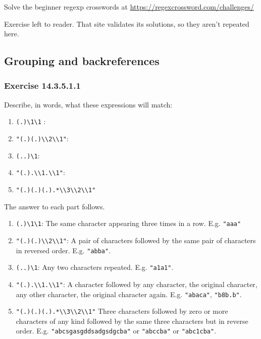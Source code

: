 \documentclass[]{book}
\providecommand{\tightlist}{%
  \setlength{\itemsep}{0pt}\setlength{\parskip}{0pt}}
\theoremstyle{plain}
\theoremstyle{remark}
\begin{document}
Solve the beginner regexp crosswords at
\url{https://regexcrossword.com/challenges/}

Exercise left to reader. That site validates its solutions, so they
aren't repeated here.

\hypertarget{grouping-and-backreferences}{%
\subsection{Grouping and
backreferences}\label{grouping-and-backreferences}}

\hypertarget{exercise-14.3.5.1.1}{%
\subsubsection*{\texorpdfstring{Exercise
{14.3.5.1.1}}{Exercise 14.3.5.1.1}}\label{exercise-14.3.5.1.1}}

Describe, in words, what these expressions will match:

\begin{enumerate}
\def\labelenumi{\arabic{enumi}.}
\tightlist
\item
  \texttt{(.)\textbackslash{}1\textbackslash{}1} :
\item
  \texttt{"(.)(.)\textbackslash{}\textbackslash{}2\textbackslash{}\textbackslash{}1"}:
\item
  \texttt{(..)\textbackslash{}1}:
\item
  \texttt{"(.).\textbackslash{}\textbackslash{}1.\textbackslash{}\textbackslash{}1"}:
\item
  \texttt{"(.)(.)(.).*\textbackslash{}\textbackslash{}3\textbackslash{}\textbackslash{}2\textbackslash{}\textbackslash{}1"}
\end{enumerate}

The answer to each part follows.

\begin{enumerate}
\def\labelenumi{\arabic{enumi}.}
\tightlist
\item
  \texttt{(.)\textbackslash{}1\textbackslash{}1}: The same character
  appearing three times in a row. E.g. \texttt{"aaa"}
\item
  \texttt{"(.)(.)\textbackslash{}\textbackslash{}2\textbackslash{}\textbackslash{}1"}:
  A pair of characters followed by the same pair of characters in
  reversed order. E.g. \texttt{"abba"}.
\item
  \texttt{(..)\textbackslash{}1}: Any two characters repeated. E.g.
  \texttt{"a1a1"}.
\item
  \texttt{"(.).\textbackslash{}\textbackslash{}1.\textbackslash{}\textbackslash{}1"}:
  A character followed by any character, the original character, any
  other character, the original character again. E.g. \texttt{"abaca"},
  \texttt{"b8b.b"}.
\item
  \texttt{"(.)(.)(.).*\textbackslash{}\textbackslash{}3\textbackslash{}\textbackslash{}2\textbackslash{}\textbackslash{}1"}
  Three characters followed by zero or more characters of any kind
  followed by the same three characters but in reverse order. E.g.
  \texttt{"abcsgasgddsadgsdgcba"} or \texttt{"abccba"} or
  \texttt{"abc1cba"}.
\end{enumerate}
\end{document}

